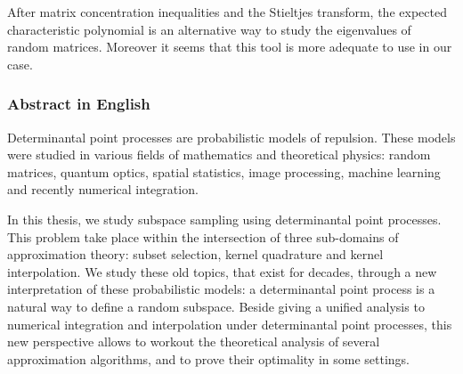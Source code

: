 \documentclass[twoside,11pt]{book}
\numberwithin{theorem}{chapter}
\numberwithin{definition}{chapter}
\numberwithin{proposition}{chapter}
\numberwithin{corollary}{chapter}
\numberwithin{example}{chapter}
\numberwithin{lemma}{chapter}
\numberwithin{assumption}{chapter}
\numberwithin{equation}{chapter}
\numberwithin{figure}{chapter}
\DeclareMathOperator{\DPP}{\mathrm{DPP}}
\DeclareMathOperator{\EX}{\mathbb{E}}
\begin{document}
After matrix concentration inequalities and the Stieltjes transform, the expected characteristic polynomial is an alternative way to study the eigenvalues of random matrices. Moreover it seems that this tool is more adequate to use in our case.









\clearpage

\subsubsection{Abstract in English}

Determinantal point processes are probabilistic models of repulsion. 
These models were studied in various fields of mathematics and theoretical physics: random matrices, quantum optics, spatial statistics, image processing, machine learning and recently numerical integration.

In this thesis, we study subspace sampling using determinantal point processes. This problem take place within the intersection of three sub-domains of approximation theory: subset selection, kernel quadrature and kernel interpolation. We study these old topics, that exist for decades, through a new interpretation of these probabilistic models: a determinantal point process is a natural way to define a random  subspace. Beside giving a unified analysis to numerical integration and interpolation under determinantal point processes, this new perspective allows to workout the theoretical analysis of several approximation algorithms, and to prove their optimality in some settings. 
\end{document}
